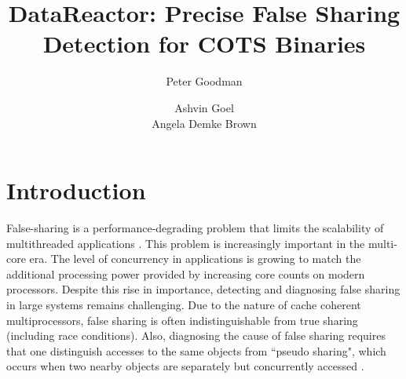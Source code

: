 \documentclass{sig-alternate}
\newcommand{\Toolname}{DataReactor}
\begin{document}
\title{\Large \bf \Toolname: Precise False Sharing Detection for COTS Binaries}
\author{
\alignauthor
Peter Goodman\\
\and
\alignauthor
Ashvin Goel\\
\alignauthor
Angela Demke Brown\\
}
\maketitle


\section{Introduction}\label{sec:intro}


False-sharing is a performance-degrading problem that limits the scalability of multithreaded applications
\cite{ImpactOfFalseSharing}. This problem is increasingly important in the multi-core era. The level of
concurrency in applications is growing to match the additional processing power provided by increasing
core counts on modern processors. Despite this rise in importance, detecting and diagnosing false
sharing in large systems remains challenging. Due to the nature of cache coherent multiprocessors, false
sharing is often indistinguishable from true sharing (including race conditions). Also, diagnosing the cause
of false sharing requires that one distinguish accesses to the same objects from ``pseudo sharing", which
occurs when two nearby objects are separately but concurrently accessed \cite{DegenerateSharingAndFalseCoherence}.
\end{document}
